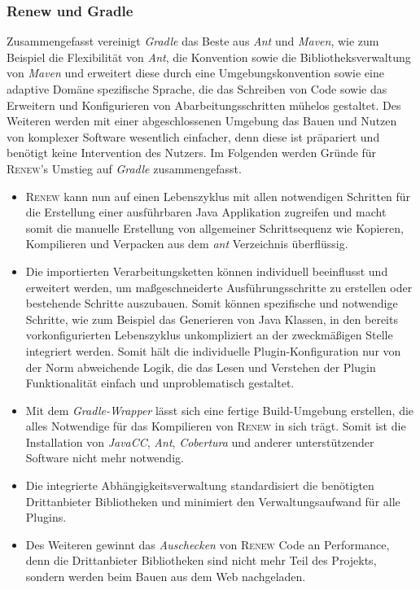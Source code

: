 		\subsubsection{Renew und Gradle}
		Zusammengefasst vereinigt \textit{Gradle} das Beste aus \textit{Ant} und \textit{Maven}, wie zum Beispiel die Flexibilität von \textit{Ant}, die Konvention sowie die Bibliotheksverwaltung von \textit{Maven} und erweitert diese durch eine Umgebungskonvention sowie eine adaptive Domäne spezifische Sprache, die das Schreiben von Code sowie das Erweitern und Konfigurieren von Abarbeitungsschritten mühelos gestaltet. Des Weiteren werden mit einer abgeschlossenen Umgebung das Bauen und Nutzen von komplexer Software wesentlich einfacher, denn diese ist präpariert und benötigt keine Intervention des Nutzers. \newline
		Im Folgenden werden Gründe für \textsc{Renew}'s Umstieg auf \textit{Gradle} zusammengefasst.\bigbreak
		\begin{itemize}
			\item \textsc{Renew} kann nun auf einen Lebenszyklus mit allen notwendigen Schritten für die Erstellung einer ausführbaren Java Applikation zugreifen und macht somit die manuelle Erstellung von allgemeiner Schrittsequenz wie Kopieren, Kompilieren und Verpacken aus dem \textit{ant} Verzeichnis überflüssig. 
			\item Die importierten Verarbeitungsketten können individuell beeinflusst und erweitert werden, um maßgeschneiderte Ausführungsschritte zu erstellen oder bestehende Schritte auszubauen. Somit können spezifische und notwendige Schritte, wie zum Beispiel das Generieren von Java Klassen, in den bereits vorkonfigurierten Lebenszyklus unkompliziert an der zweckmäßigen Stelle integriert werden. Somit hält die individuelle Plugin-Konfiguration nur von der Norm abweichende Logik, die das Lesen und Verstehen der Plugin Funktionalität einfach und unproblematisch gestaltet. 
			\item Mit dem \textit{Gradle-Wrapper} lässt sich eine fertige Build-Umgebung erstellen, die alles Notwendige für das Kompilieren von \textsc{Renew} in sich trägt. Somit ist die Installation von \textit{JavaCC}, \textit{Ant}, \textit{Cobertura} und anderer unterstützender Software nicht mehr notwendig.
			\item Die integrierte Abhängigkeitsverwaltung standardisiert die benötigten Drittanbieter Bibliotheken und minimiert den Verwaltungsaufwand für alle Plugins. 
			\item Des Weiteren gewinnt das \textit{Auschecken} von \textsc{Renew} Code an Performance, denn die Drittanbieter Bibliotheken sind nicht mehr Teil des Projekts, sondern werden beim Bauen aus dem Web nachgeladen.
		\end{itemize}
